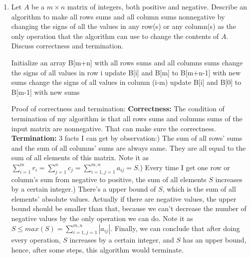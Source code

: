 \documentclass{article}       %
\begin{document}
\begin{enumerate}
\begin{enumerate}
        \end{enumerate}
        \item Let $A$ be a $m \times n$ matrix of integers, both positive and negative. Describe an algorithm to make all rows sums and all column sums nonnegative by changing the signs of all the values in any row(s) or any column(s) as the only operation that the algorithm can use to change the contents of $A$. Discuss correctness and termination.\newline
        \begin{algorithm}[H]
        	\small
        	\begin{algorithmic}[1]
        		\State Initialize an array B[m+n] with all rows sums and all columns sums 
        		\State change the signs of all values in row i
        		\State update B[i] and B[m] to B[m+n-1] with new sums
        		\Else
        		\State change the signs of all values in column (i-m)
        		\State update B[i] and B[0] to B[m-1] with new sums
        		\EndIf
        		\EndWhile
        		\EndProcedure
        	\end{algorithmic}\label{p1}
        \end{algorithm}
        Proof of correctness and termination:\newline
        \textbf{Correctness:} The condition of termination of my algorithm is that all rows sums and columns sums of the input matrix are nonnegative. That can make sure the correctness.\newline
        \textbf{Termination:} 3 facts I can get by observation:) The sum of all rows' sums and the sum of all columns' sums are always same. They are all equal to the sum of all elements of this matrix. \newline
        Note it as $\sum_{i=1}^{m} r_i= \sum_{j=1}^{n} c_j = \sum_{i=1, j=1}^{m, n} a_{ij} = S$.) Every time I get one row or column's sum from negative to positive, the sum of all elements $S$ increases by a certain integer.) There's a upper bound of $S$, which is the sum of all elements' absolute values. Actually if there are negative values, the upper bound should be smaller than that, because we can't decrease the number of negative values by the only operation we can do.\newline
        Note it as $S \leq max(S) =  \sum_{i=1, j=1}^{m, n} |a_{ij}|$.\newline
        Finally, we can conclude that after doing every operation, $S$ increases by a certain integer, and $S$ has an upper bound, hence, after some steps, this algorithm would terminate.
       
                
                
\end{enumerate}
\end{document}
